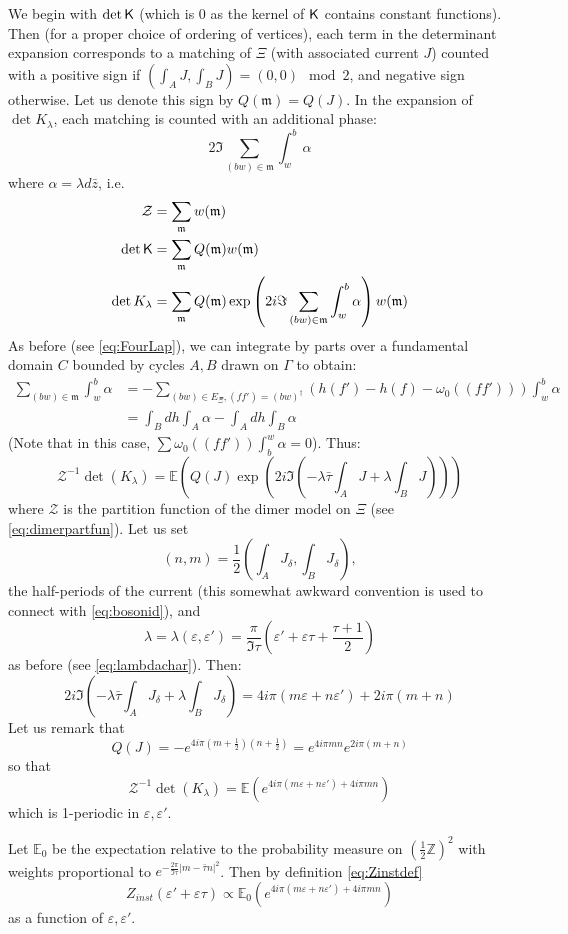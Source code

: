 \documentclass[10pt]{article}
\newcommand{\Z}{\mathbb{Z}}
\newcommand{\E}{\mathbb{E}}
\newcommand{\mc}{\mathcal}
\newcommand{\mf}{\mathfrak}
\newcommand{\eps}{\varepsilon}
\newcommand{\rK}{{\sf K}}
\newcommand{\dg}{\dagger}
\newcommand{\mfm}{{\mathfrak m}}
\begin{document}
We begin with $\det\rK$ (which is 0 as the kernel of $\rK$ contains constant functions). Then (for a proper choice of ordering of vertices), each term in the determinant expansion corresponds to a matching of $\Xi$ (with associated current $J$) counted with a positive sign if $(\int_A J,\int_B J)=(0,0)\mod 2$, and negative sign otherwise. Let us denote this sign by $Q({\mf m})=Q(J)$.
%
%
%
%
%
%
%
In the expansion of $\det K_\lambda$, each matching is counted with an additional phase:
$$2\Im\sum_{(bw)\in{\mf m}}\int_w^b\alpha$$
where $\alpha=\lambda d\bar z$, i.e.
\begin{align*}
{\mc Z}&=\sum_\mfm w(\mfm)\\
\det\rK&=\sum_{\mfm}Q(\mfm)w(\mfm)\\
\det K_\lambda&=\sum_{\mfm}Q(\mfm)\exp\left(2i\Im\sum_{(bw)\in{\mf m}}\int_w^b\alpha\right)w(\mfm)
\end{align*}
As before (see \eqref{eq:FourLap}), we can integrate by parts over a fundamental domain $C$ bounded by cycles $A,B$ drawn on $\Gamma$ to obtain:
\begin{align*}
\sum_{(bw)\in{\mf m}}\int_w^b\alpha&=-\sum_{(bw)\in E_\Xi, (ff')=(bw)^\dg}(h(f')-h(f)-\omega_0((ff')))\int_w^b\alpha\\
&=\int_Bdh\int_A\alpha-\int_Adh\int_B\alpha
\end{align*}
(Note that in this case, $\sum\omega_0((ff'))\int_b^w\alpha=0$). Thus:
$${\mc Z}^{-1}\det(K_\lambda)=\E\left(Q(J)\exp(2i\Im(-\lambda\bar\tau\int_A J+\lambda\int_B J))\right)$$
where ${\mc Z}$ is the partition function of the dimer model on $\Xi$ (see \eqref{eq:dimerpartfun}). Let us set 
\begin{equation}\label{eq:halfpers}
(n,m)=\frac 12(\int_A J_\delta,\int_B J_\delta),
\end{equation}
the half-periods of the current (this somewhat awkward convention is used to connect with \eqref{eq:bosonid}), and 
$$\lambda=\lambda(\eps,\eps')=\frac{\pi}{\Im\tau}\left(\eps'+\eps\tau+\frac{\tau+1}2\right)$$
as before (see \eqref{eq:lambdachar}). Then:
$$2i\Im(-\lambda\bar\tau\int_A J_\delta+\lambda\int_B J_\delta)=4i\pi(m\eps+n\eps')+2i\pi(m+n)$$
Let us remark that
$$Q(J)=-e^{4i\pi (m+\frac 12)(n+\frac 12)}=e^{4i\pi mn}e^{2i\pi(m+n)}$$
so that
\begin{equation}\label{eq:torusabelianpert}
{\mc Z}^{-1}\det(K_\lambda)=\E\left(e^{4i\pi(m\eps+n\eps')+4i\pi mn}\right)
\end{equation}
which is 1-periodic in $\eps,\eps'$. 

Let $\E_0$ be the expectation relative to the probability measure on $(\frac 12\Z)^2$ with weights proportional to $e^{-\frac{2\pi}{\Im\tau}|m-\bar\tau n|^2}$. Then by definition \eqref{eq:Zinstdef}
$$Z_{inst}(\eps'+\eps\tau)\propto\E_0\left(e^{4i\pi(m\eps+n\eps')+4i\pi mn}\right)$$
as a function of $\eps,\eps'$.
\end{document}
